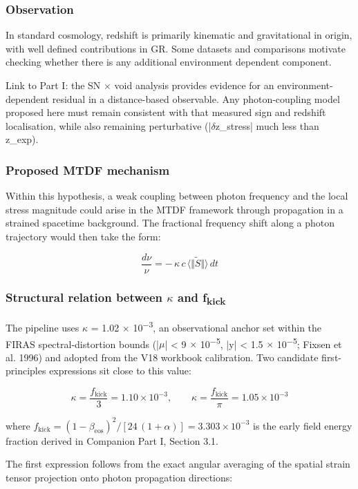 \documentclass[11pt,a4paper]{article}
\begin{document}
\subsubsection{Observation}
In standard cosmology, redshift is primarily kinematic and gravitational in origin, with well defined contributions in GR. Some datasets and comparisons motivate checking whether there is any additional environment dependent component.

Link to Part I: the SN $\times$ void analysis provides evidence for an environment-dependent residual in a distance-based observable. Any photon-coupling model proposed here must remain consistent with that measured sign and redshift localisation, while also remaining perturbative (|$\delta$z\_\allowbreak{}stress| much less than z\_\allowbreak{}exp).

\subsubsection{Proposed MTDF mechanism}
Within this hypothesis, a weak coupling between photon frequency and the local stress magnitude could arise in the MTDF framework through propagation in a strained spacetime background. The fractional frequency shift along a photon trajectory would then take the form:

$$
\frac{d\nu}{\nu} = -\,\kappa\,c\,\langle \Vert \tilde{S}\Vert\rangle\,dt
$$

\subsubsection{Structural relation between $\kappa$ and f\textsubscript{kick}}
The pipeline uses $\kappa$ = 1.02 $\times$ 10\textsuperscript{$-$3}, an observational anchor set within the FIRAS spectral-distortion bounds (|$\mu$| < 9 $\times$ 10\textsuperscript{$-$5}, |y| < 1.5 $\times$ 10\textsuperscript{$-$5}; Fixsen et al. 1996) and adopted from the V18 workbook calibration. Two candidate first-principles expressions sit close to this value:

$$
\kappa = \frac{f_{\mathrm{kick}}}{3} = 1.10 \times 10^{-3}, \qquad \kappa = \frac{f_{\mathrm{kick}}}{\pi} = 1.05 \times 10^{-3}
$$

where \(f_{\mathrm{kick}} = (1-\beta_{\mathrm{eos}})^2 / [24\,(1+\alpha)] = 3.303 \times 10^{-3}\) is the early field energy fraction derived in Companion Part I, Section 3.1.

The first expression follows from the exact angular averaging of the spatial strain tensor projection onto photon propagation directions:
\end{document}
